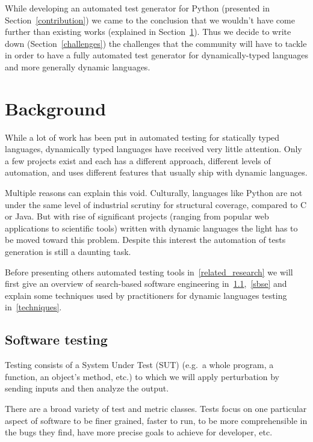 \documentclass{llncs2e/llncs}
\begin{document}
While developing an automated test generator for Python (presented in
Section~\ref{contribution}) we came to the conclusion that we wouldn't have come
further than existing works (explained in Section~\ref{relatedwork}). Thus we
decide to write down (Section~\ref{challenges}) the challenges that the
community will have to tackle in order to have a fully automated test generator
for dynamically-typed languages and more generally dynamic languages.


\section{Background}
\label{relatedwork}

While a lot of work has been put in automated testing for statically typed
languages, dynamically typed languages have received very little attention. Only
a few projects exist and each has a different approach, different levels of
automation, and uses different features that usually ship with dynamic
languages.

Multiple reasons can explain this void. Culturally, languages like Python are
not under the same level of industrial scrutiny for structural coverage,
compared to C or Java. But with rise of significant projects (ranging from
popular web applications to scientific tools) written with dynamic languages the
light has to be moved toward this problem.  Despite this interest the automation
of tests generation is still a daunting task.

Before presenting others automated testing tools in~\ref{related_research} we
will first give an overview of search-based software engineering in~\ref{st},~\ref{sbse}
and explain some techniques used by practitioners for dynamic languages testing
in~\ref{techniques}.

\subsection{Software testing}
\label{st}

Testing consists of a System Under Test (SUT) (e.g.\ a whole program, a
function, an object's method, etc.) to which we will apply perturbation by
sending inputs and then analyze the output.

There are a broad variety of test and metric classes. Tests focus on one
particular aspect of software to be finer grained, faster to run, to be more
comprehensible in the bugs they find, have more precise goals to achieve for
developer, etc.
\end{document}
